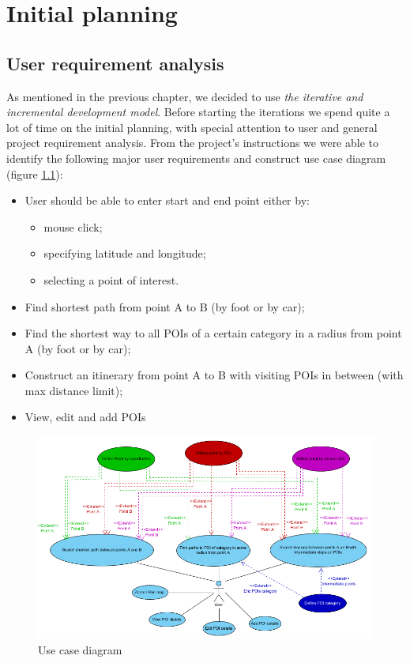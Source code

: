 
\chapter{Initial planning} %

\label{Chapter3} %


\section{User requirement analysis}
\label{(user_req)}
As mentioned in the previous chapter, we decided to use \textit{the iterative and incremental development model}. Before starting the iterations we spend quite a lot of time on the initial planning, with special attention to user and general project requirement analysis. From the project's instructions we were able to identify the following major user requirements and construct use case diagram (figure \ref{fig:gen_use_case_diag}):
\begin{itemize}
\item User should be able to enter start and end point either by:
\begin{itemize}
\item mouse click;
\item specifying latitude and longitude;
\item selecting a point of interest.
\end{itemize}
\item Find shortest path from point A to B (by foot or by car);
\item Find the shortest way to all POIs of a certain category in a radius from point A (by foot or by car);
\item Construct an itinerary from point A to B with visiting POIs in between (with max distance limit);
\item View, edit and add POIs
\end{itemize}

\begin{figure}[h]
\centering
\includegraphics[width=0.95\linewidth]{../pictures/use_case_diagram_general}
\caption{Use case diagram}
\label{fig:gen_use_case_diag}
\end{figure}


